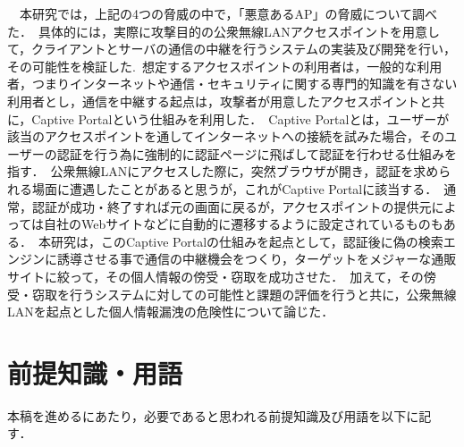 \documentclass[dvipdfmx]{jsarticle}
\begin{document}
        　本研究では，上記の4つの脅威の中で，「悪意あるAP」の脅威について調べた．\
        具体的には，実際に攻撃目的の公衆無線LANアクセスポイントを用意して，クライアントとサーバの通信の中継を行うシステムの実装及び開発を行い，その可能性を検証した.\
        想定するアクセスポイントの利用者は，一般的な利用者，つまりインターネットや通信・セキュリティに関する専門的知識を有さない利用者とし，通信を中継する起点は，攻撃者が用意したアクセスポイントと共に，Captive Portalという仕組みを利用した．\
        Captive Portalとは，ユーザーが該当のアクセスポイントを通してインターネットへの接続を試みた場合，そのユーザーの認証を行う為に強制的に認証ページに飛ばして認証を行わせる仕組みを指す．\
        公衆無線LANにアクセスした際に，突然ブラウザが開き，認証を求められる場面に遭遇したことがあると思うが，これがCaptive Portalに該当する．\
        通常，認証が成功・終了すれば元の画面に戻るが，アクセスポイントの提供元によっては自社のWebサイトなどに自動的に遷移するように設定されているものもある．\
        本研究は，このCaptive Portalの仕組みを起点として，認証後に偽の検索エンジンに誘導させる事で通信の中継機会をつくり，ターゲットをメジャーな通販サイトに絞って，その個人情報の傍受・窃取を成功させた．\
        加えて，その傍受・窃取を行うシステムに対しての可能性と課題の評価を行うと共に，公衆無線LANを起点とした個人情報漏洩の危険性について論じた．\
    \section{前提知識・用語}
        本稿を進めるにあたり，必要であると思われる前提知識及び用語を以下に記す．\
\end{document}
